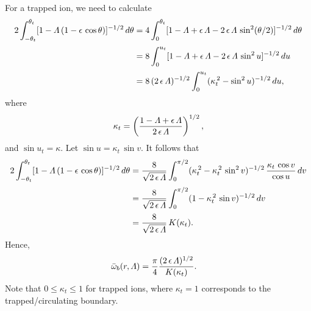 \documentclass[12pt,prb,aps,notitlepage]{revtex4-1}
\begin{document}
For a trapped ion, we need to calculate 
\begin{align}
2\int_{-\theta_t}^{\theta_t} [1-{\mit\Lambda}\,(1-\epsilon\,\cos\theta)]^{-1/2}\,d\theta &=4\int_0^{\theta_t}[1-{\mit\Lambda}+\epsilon\,{\mit\Lambda} - 2\,\epsilon\,{\mit\Lambda}\,\sin^2(\theta/2)]^{-1/2}\,d\theta\nonumber\\[0.5ex]
&=8\int_0^{u_t}[1-{\mit\Lambda}+\epsilon\,{\mit\Lambda} - 2\,\epsilon\,{\mit\Lambda}\,\sin^2 u]^{-1/2}\,du\\[0.5ex]
&=8\,(2\,\epsilon\,{\mit\Lambda})^{-1/2}\int _0^{u_t}(\kappa_t^{\,2}- \sin^2 u)^{-1/2}\,du,
\end{align}
where
\begin{equation}
\kappa_t = \left(\frac{1-{\mit\Lambda}+\epsilon\,{\mit\Lambda}}{2\,\epsilon\,{\mit\Lambda}}\right)^{1/2}, 
\end{equation}
 and 
$\sin u_t =\kappa$. 
Let
$\sin u = \kappa_t\,\sin v$.
It follows that 
\begin{align}
2\int_{-\theta_t}^{\theta_t} [1-{\mit\Lambda}\,(1-\epsilon\,\cos\theta)]^{-1/2}\,d\theta&=\frac{8}{\sqrt{2\,\epsilon\,{\mit\Lambda}}}\int_0^{\pi/2}
(\kappa_t^{\,2}-\kappa_t^{\,2}\,\sin^2 v)^{-1/2}\,\frac{\kappa_t\,\cos v}{\cos u}\,dv\nonumber\\[0.5ex]
&=\frac{8}{\sqrt{2\,\epsilon\,{\mit\Lambda}}}\int_0^{\pi/2}
(1-\kappa_t^{\,2}\,\sin v)^{-1/2}\,dv\nonumber\\[0.5ex]
 &=\frac{8}{\sqrt{2\,\epsilon\,{\mit\Lambda}}}\,K(\kappa_t).
\end{align}
Hence,
\begin{align}\label{ebouncet}
\bar{\omega}_b(r,{\mit\Lambda}) &=\frac{\pi}{4}\frac{(2\,\epsilon\,{\mit\Lambda})^{1/2}}{K(\kappa_t)}.
\end{align}
Note that $0\leq \kappa_t\leq 1$ for trapped ions, where $\kappa_t=1$ corresponds to the trapped/circulating boundary. 
\end{document}
